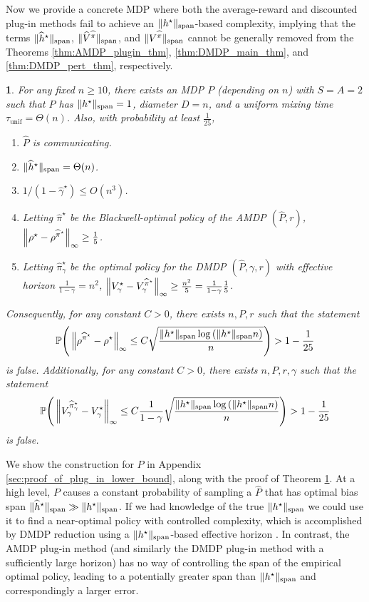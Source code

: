 \documentclass{article}
\theoremstyle{plain}
\newtheorem{thm}{\protect\theoremname}
\theoremstyle{plain}
\theoremstyle{remark}
\theoremstyle{plain}
\theoremstyle{plain}
\providecommand{\theoremname}{Theorem}
\renewcommand{\P}{\mathbb{P}}
\newcommand{\Phat}{\widehat{P}}
\newcommand{\Vhat}{\widehat{V}}
\newcommand{\pihstar}{\widehat{\pi}^\star}
\newcommand{\pihat}{\widehat{\pi}}
\newcommand{\hhat}{\widehat{h}}
\newcommand{\tmix}{\tau_{\mathrm{unif}}}
\newcommand{\empbod}{\widehat{\gamma}^\star}
\newcommand{\plugin}{plug-in\xspace}
\begin{document}
Now we provide a concrete MDP where both the average-reward and discounted \plugin methods fail to achieve an $\Vert h^\star\Vert _{\textnormal{span}}$-based complexity, implying that the terms $\spannorm{\hhat^\star}$, $\spannorm{\Vhat^{\pihat}}$, and $\spannorm{V^{\pihat}}$ cannot be generally removed from the Theorems \ref{thm:AMDP_plugin_thm}, \ref{thm:DMDP_main_thm}, and \ref{thm:DMDP_pert_thm}, respectively.
\begin{thm}
\label{thm:plug_in_lower_bound}
    For any fixed $n \geq 10$, there exists an MDP $P$ (depending on $n$) with $S = A = 2$ such that $P$ has $\Vert h^\star\Vert _{\textnormal{span}} = 1$, diameter $D = n$, and a uniform mixing time $\tmix = \Theta(n)$.
    Also, with probability at least $\frac{1}{25}$, 
        \begin{enumerate}[itemsep=0pt, topsep=0pt]
            \item $\Phat$ is communicating.
            \item $\spannorm{\hhat^\star} = \Theta(n)$.
            \item $1/(1-\empbod) \leq O(n^3)$.
            \item Letting $\pihstar$ be the Blackwell-optimal policy of the AMDP $(\Phat, r)$, $\infnorm{\rho^\star - \rho^{\pihstar}} \geq  \frac{1}{5}$.
            \item Letting $\pihstar_\gamma$ be the optimal policy for the DMDP $(\Phat, \gamma, r)$ with effective horizon $\frac{1}{1-\gamma} = n^2$, $\infnorm{V_\gamma^\star - V_\gamma^{\pihstar}} \geq \frac{n^2}{5} = \frac{1}{1-\gamma}\frac{1}{5}$.
        \end{enumerate}
    Consequently, for any constant $C>0$, there exists $n, P, r$ such that the statement
        \[
        \P \Bigg( \infnorm{\rho^{\pihstar} - \rho^\star}\leq C \sqrt{\frac{\spannorm{h^\star} \log\left(\spannorm{h^\star} n \right)}{n}} \Bigg) > 1 - \frac{1}{25}
        \]
    is false.
    Additionally, for any constant $C>0$, there exists $n, P, r, \gamma$ such that the statement
        \[
        \P \Bigg( \infnorm{V_\gamma^{\pihstar_\gamma} - V_\gamma^{\star}} \leq C \frac{1}{1-\gamma}\sqrt{\frac{\spannorm{h^\star} \log\left(\spannorm{h^\star} n \right)}{n}} \Bigg) > 1 - \frac{1}{25}
        \]
    is false.
\end{thm}
We show the construction for $P$ in Appendix \ref{sec:proof_of_plug_in_lower_bound}, along with the proof of Theorem \ref{thm:plug_in_lower_bound}. At a high level, $P$ causes a constant probability of sampling a $\Phat$ that has optimal bias span $\spannorm{\hhat^\star} \gg \spannorm{h^\star}$. If we had knowledge of the true $\Vert h^\star\Vert _{\textnormal{span}}$ we could use it to find a near-optimal policy with controlled complexity, which is accomplished by DMDP reduction using a $\Vert h^\star\Vert _{\textnormal{span}}$-based effective horizon \citep{zurek_span-based_2025}. In contrast, the AMDP \plugin method (and similarly the DMDP \plugin method with a sufficiently large horizon) has no way of controlling the span of the empirical optimal policy, leading to a potentially greater span than $\Vert h^\star\Vert _{\textnormal{span}}$ and correspondingly a larger error.
\end{document}
